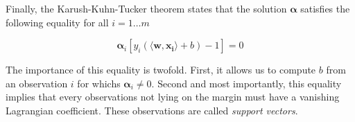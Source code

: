 Finally, the Karush-Kuhn-Tucker theorem states that the solution $\boldsymbol{\alpha}$ satisfies the following equality for all $i = 1\dotsc m$

\begin{equation}
  \boldsymbol{\alpha}_i[y_i(\langle \mathbf{w}, \mathbf{x_i}\rangle + b) - 1] = 0
\end{equation}

The importance of this equality is twofold. First, it allows us to compute $b$ from an observation $i$ for whichs $\boldsymbol{\alpha}_i \neq 0$. Second and most importantly, this equality implies that every observations not lying on the margin must have a vanishing Lagrangian coefficient. These observations are called \textit{support vectors}.